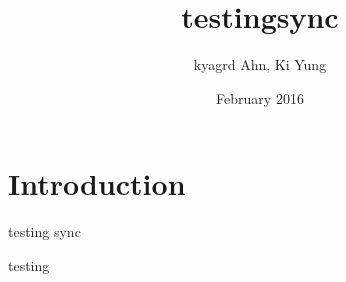 \documentclass{article}
\title{testingsync}
\author{kyagrd Ahn, Ki Yung}
\date{February 2016}
\begin{document}
\maketitle

\section{Introduction}
testing sync

testing
\end{document}
